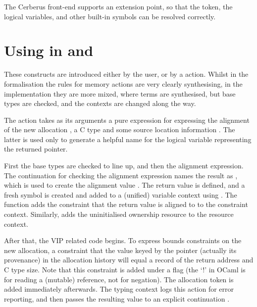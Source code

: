 
The Cerberus front-end supports an extension point, so that the
 token, the  logical variables, and other
built-in symbols can be resolved correctly.

\section{Using  in  and }

These constructs are introduced either by the user, or by a 
action. Whilst in the formalisation the rules for memory actions are very
clearly synthesising, in the implementation they are more mixed, where terms
are synthesised, but base types are checked, and the contexts are changed along
the way.

The  action takes as its arguments a pure expression for expressing
the alignment of the new allocation , a C type  and some
source location information . The latter is used only to generate
a helpful name for the logical variable representing the returned pointer.

First the base types are checked to line up, and then the alignment expression.
The continuation for checking the alignment expression names the result as
, which is used to create the alignment value
. The return value  is defined, and a
fresh symbol is created  and added to a (unified) variable
context using . The function  adds the
constraint that the return value  is aligned to
 to the constraint context. Similarly, 
adds the uninitialised ownership resource to the resource context.


After that, the VIP related code begins. To express bounds constraints on the
new allocation, a constraint that the value keyed by the pointer (actually its
provenance) in the allocation history will equal a record of the return address
and C type size. Note that this constraint is added under a flag
 (the `!' in OCaml is for reading a (mutable) reference,
not for negation). The allocation token is added immediately afterwards. The
typing context logs this action for error reporting, and then passes the
resulting value to an explicit continuation .


